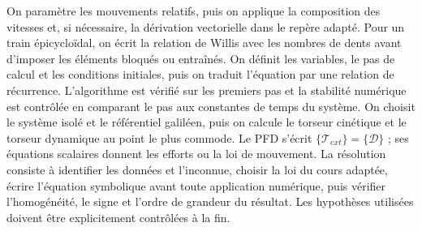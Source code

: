 \begin{corrigebox}[Corrigé]
On paramètre les mouvements relatifs, puis on applique la composition des vitesses et, si nécessaire, la dérivation vectorielle dans le repère adapté. Pour un train épicycloïdal, on écrit la relation de Willis avec les nombres de dents avant d'imposer les éléments bloqués ou entraînés.
On définit les variables, le pas de calcul et les conditions initiales, puis on traduit l'équation par une relation de récurrence. L'algorithme est vérifié sur les premiers pas et la stabilité numérique est contrôlée en comparant le pas aux constantes de temps du système.
On choisit le système isolé et le référentiel galiléen, puis on calcule le torseur cinétique et le torseur dynamique au point le plus commode. Le PFD s'écrit $\{\mathcal T_{ext}\}=\{\mathcal D\}$ ; ses équations scalaires donnent les efforts ou la loi de mouvement.
La résolution consiste à identifier les données et l'inconnue, choisir la loi du cours adaptée, écrire l'équation symbolique avant toute application numérique, puis vérifier l'homogénéité, le signe et l'ordre de grandeur du résultat. Les hypothèses utilisées doivent être explicitement contrôlées à la fin.
\end{corrigebox}
